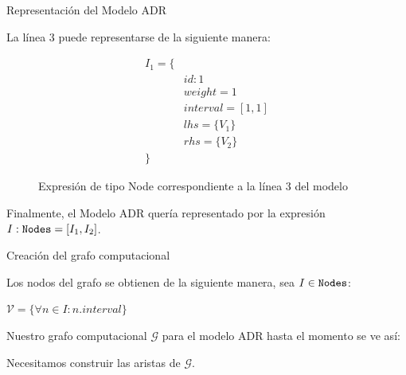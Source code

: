 \begin{frame}[fragile]{Representación del Modelo ADR}

La línea 3 puede representarse de la siguiente manera:

\begin{figure}
  \footnotesize
  \begin{equation*}
    \begin{split}
      I_1 = \{ \\
      & id: 1 \\
      & weight = 1 \\
      & interval = [1, 1]\\
      & lhs = \{ V_1 \} \\
      & rhs = \{ V_2 \} \\
      \}
    \end{split}
  \end{equation*}
  \captionsetup{font=footnotesize}
  \caption{Expresión de tipo Node correspondiente a la línea 3 del modelo}
\end{figure}

Finalmente, el Modelo ADR quería representado por la expresión
$I : \verb|Nodes| = [I_1, I_2]$.

\end{frame}


\begin{frame}[fragile]{Creación del grafo computacional}

  Los nodos del grafo se obtienen de la siguiente manera, sea $I \in \verb|Nodes|$:

  $\mathcal{V} = \{ \forall n \in I: n.interval \}$

  Nuestro grafo computacional $\mathcal{G}$ para el modelo ADR hasta el momento
  se ve así:

\vspace{1em}

  \centering
  \footnotesize
\pause

\small
\vspace{1em}
\centering
Necesitamos construir las aristas de $\mathcal{G}$.

\end{frame}



